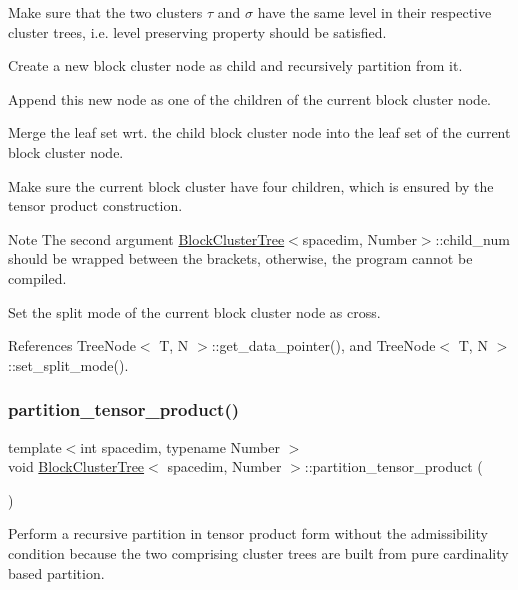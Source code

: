 Make sure that the two clusters $\tau$ and $\sigma$ have the same level in their respective cluster trees, i.\+e. level preserving property should be satisfied.

Create a new block cluster node as child and recursively partition from it.

Append this new node as one of the children of the current block cluster node.

Merge the leaf set wrt. the child block cluster node into the leaf set of the current block cluster node.

Make sure the current block cluster have four children, which is ensured by the tensor product construction.


\begin{DoxyDescription}
\item[Note ]The second argument {\ttfamily \hyperlink{classBlockClusterTree}{Block\+Cluster\+Tree}$<$spacedim}, Number$>$\+::child\+\_\+num should be wrapped between the brackets, otherwise, the program cannot be compiled. 
\end{DoxyDescription}

Set the split mode of the current block cluster node as cross.

References Tree\+Node$<$ T, N $>$\+::get\+\_\+data\+\_\+pointer(), and Tree\+Node$<$ T, N $>$\+::set\+\_\+split\+\_\+mode().

\mbox{\label{classBlockClusterTree_ab10f54639969bc4aacd6aa27cf315610}} 
\subsubsection{\texorpdfstring{partition\+\_\+tensor\+\_\+product()}{partition\_tensor\_product()}}
{\footnotesize\ttfamily template$<$int spacedim, typename Number $>$ \\
void \hyperlink{classBlockClusterTree}{Block\+Cluster\+Tree}$<$ spacedim, Number $>$\+::partition\+\_\+tensor\+\_\+product (\begin{DoxyParamCaption}{ }\end{DoxyParamCaption})}

Perform a recursive partition in tensor product form without the admissibility condition because the two comprising cluster trees are built from pure cardinality based partition. 

